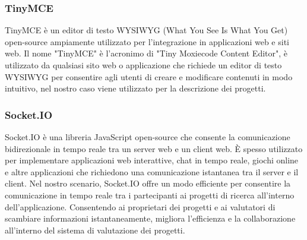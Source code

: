 \documentclass{article}
\begin{document}
\subsubsection{TinyMCE}
TinyMCE è un editor di testo WYSIWYG (What You See Is What You Get) open-source ampiamente utilizzato per l'integrazione in applicazioni web e siti web. Il nome "TinyMCE" è l'acronimo di "Tiny Moxiecode Content Editor", è utilizzato da qualsiasi sito web o applicazione che richiede un editor di testo WYSIWYG per consentire agli utenti di creare e modificare contenuti in modo intuitivo, nel nostro caso viene utilizzato per la descrizione dei progetti.
\subsubsection{Socket.IO}
Socket.IO è una libreria JavaScript open-source che consente la comunicazione bidirezionale in tempo reale tra un server web e un client web. È spesso utilizzato per implementare applicazioni web interattive, chat in tempo reale, giochi online e altre applicazioni che richiedono una comunicazione istantanea tra il server e il client. Nel nostro scenario, Socket.IO offre un modo efficiente per consentire la comunicazione in tempo reale tra i partecipanti ai progetti di ricerca all'interno dell'applicazione. Consentendo ai proprietari dei progetti e ai valutatori di scambiare informazioni istantaneamente, migliora l'efficienza e la collaborazione all'interno del sistema di valutazione dei progetti.
\end{document}
